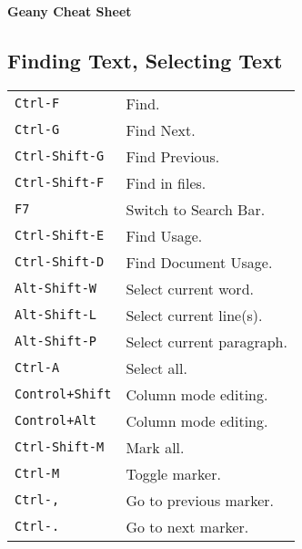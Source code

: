 




\raggedright
\footnotesize

\begin{center}
	\Huge{\textbf{Geany Cheat Sheet}} \\
\end{center}
\vspace*{0.5cm}

\begin{multicols}{3}


	\setlength{\premulticols}{1pt}
	\setlength{\postmulticols}{1pt}
	\setlength{\multicolsep}{1pt}
	\setlength{\columnsep}{2pt}


	\section{Finding Text, Selecting Text}
	\begin{tabular}{@{}ll@{}}
		\verb!Ctrl-F!        & Find.                     \\
		\verb!Ctrl-G!        & Find Next.                \\
		\verb!Ctrl-Shift-G!  & Find Previous.            \\
		\verb!Ctrl-Shift-F!  & Find in files.            \\
		\verb!F7!            & Switch to Search Bar.     \\
		\verb!Ctrl-Shift-E!  & Find Usage.               \\
		\verb!Ctrl-Shift-D!  & Find Document Usage.      \\
		\verb!Alt-Shift-W!   & Select current word.      \\
		\verb!Alt-Shift-L!   & Select current line(s).   \\
		\verb!Alt-Shift-P!   & Select current paragraph. \\
		\verb!Ctrl-A!        & Select all.               \\
		\verb!Control+Shift! & Column mode editing.      \\
		\verb!Control+Alt!   & Column mode editing.      \\
		\verb!Ctrl-Shift-M!  & Mark all.                 \\
		\verb!Ctrl-M!        & Toggle marker.            \\
		\verb!Ctrl-,!        & Go to previous marker.    \\
		\verb!Ctrl-.!        & Go to next marker.        \\
	\end{tabular}


\end{multicols}
